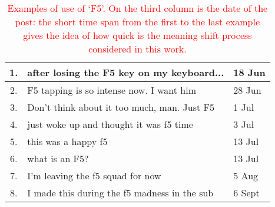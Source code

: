 \begin{table}[t]\centering   \small
    \begin{tabular}{cp{5.5cm}l}
        \hline
        1. & after losing the F5 key on my keyboard... & 18 Jun\\\hline
        2. & F5 tapping is so intense now. I want him & 28 Jun\\\hline
        3. & Don't think about it too much, man. Just F5 & 1 Jul\\\hline
        4. & just woke up and thought it was f5 time & 3 Jul\\\hline
        5. & this was a happy f5 & 13 Jul\\\hline
        6. & what is an F5? & 13 Jul \\\hline
        7. & I'm leaving the f5 squad for now & 5 Aug\\\hline
        8. & I made this during the f5 madness in the sub & 6 Sept\\\hline
        
    \end{tabular}
    \vspace*{-0.2cm}
    \caption{\textcolor{red}{Examples of use of `F5'. On the third column is the date of the post: the short time span  from the first to the last example gives the idea of how quick is the meaning shift process considered in this work.}}
    \vspace*{-0.2cm}
     \label{table:f5}
\end{table}
